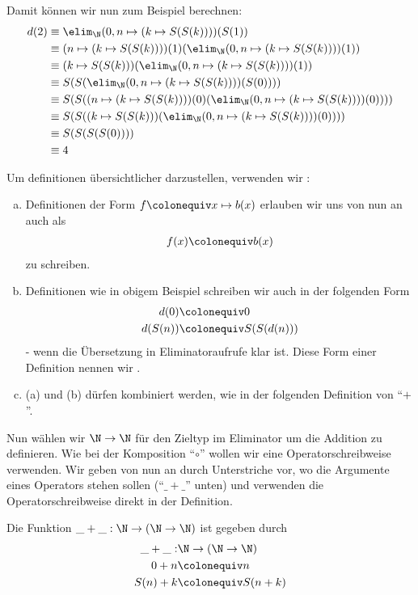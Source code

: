 Damit können wir nun zum Beispiel berechnen:
\begin{align*}
  d(2)&\equiv \elim_\N(0,n\mapsto (k\mapsto S(S(k))))(S(1)) \\
      &\equiv (n\mapsto (k\mapsto S(S(k))))(1)(\elim_\N(0,n\mapsto (k\mapsto S(S(k))))(1)) \\
      &\equiv (k\mapsto S(S(k)))(\elim_\N(0,n\mapsto (k\mapsto S(S(k))))(1)) \\
      &\equiv S(S(\elim_\N(0,n\mapsto (k\mapsto S(S(k))))(S(0)))) \\
      &\equiv S(S((n\mapsto (k\mapsto S(S(k))))(0)(\elim_\N(0,n\mapsto (k\mapsto S(S(k))))(0)))) \\
      &\equiv S(S((k\mapsto S(S(k)))(\elim_\N(0,n\mapsto (k\mapsto S(S(k))))(0)))) \\
      &\equiv S(S(S(S(0)))) \\
      &\equiv 4
\end{align*}

Um definitionen übersichtlicher darzustellen, verwenden wir :

\begin{konvention}
\begin{enumerate}[(a)]
\item Definitionen der Form $f\colonequiv x\mapsto b(x)$ erlauben wir uns von nun an auch als
  \begin{align*}
    f(x)\colonequiv b(x)
  \end{align*}
  zu schreiben. 
\item Definitionen wie in obigem Beispiel schreiben wir auch in der folgenden Form
  \begin{align*}
    d(0)&\colonequiv 0 \\
    d(S(n))&\colonequiv S(S(d(n))) 
  \end{align*}
  - wenn die Übersetzung in Eliminatoraufrufe klar ist.
  Diese Form einer Definition nennen wir .
\item (a) und (b) dürfen kombiniert werden, wie in der folgenden Definition von ``$+$''.
\end{enumerate}
\end{konvention}

Nun wählen wir $\N\to\N$ für den Zieltyp im Eliminator um die Addition zu definieren.
Wie bei der Komposition ``$\circ$'' wollen wir eine Operatorschreibweise verwenden.
Wir geben von nun an durch Unterstriche vor, wo die Argumente eines Operators stehen sollen (``$\_+\_$'' unten) und verwenden die Operatorschreibweise direkt in der Definition.
\begin{definition}
  Die Funktion $\_+\_:\N\to (\N\to \N)$ ist gegeben durch
  \begin{align*}
    \_+\_:&\N\to (\N\to \N) \\
      0+n&\colonequiv n \\
     S(n)+k&\colonequiv S(n+k)
  \end{align*}
\end{definition}

